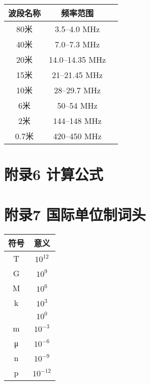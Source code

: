 \begin{tabular}{|c|c|c|}
	\hline
	\textbf{波段名称} & \textbf{频率范围} \\
	\hline
	80米 & 3.5–4.0 MHz \\
	\hline
	40米 & 7.0–7.3 MHz \\
	\hline
	20米 & 14.0–14.35 MHz \\
	\hline
	15米 & 21–21.45 MHz \\
	\hline
	10米 & 28–29.7 MHz \\
	\hline
	6米 & 50–54 MHz \\
	\hline
	2米 & 144–148 MHz \\
	\hline
	0.7米 & 420–450 MHz \\
	\hline
\end{tabular}

\newpage

\section{附录6 计算公式}




\newpage

\section{附录7 国际单位制词头}

\begin{tabular}{|c|c|}
	\hline
	\textbf{符号} & \textbf{意义} \\
	\hline
	T & $10^{12}$ \\
	\hline
	G & $10^{9}$ \\
	\hline
	M & $10^{6}$ \\
	\hline
	k & $10^{3}$ \\
	\hline
	 & $10^{0}$ \\
	\hline
	m & $10^{-3}$ \\
	\hline
	μ & $10^{-6}$ \\
	\hline
	n & $10^{-9}$ \\
	\hline
	p & $10^{-12}$ \\
	\hline
\end{tabular}

